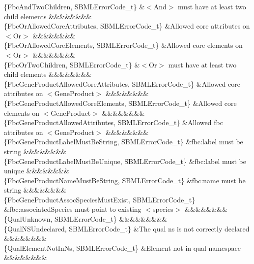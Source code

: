 \begin{DoxyParagraph}{}
\begin{longtabu}
\{Fbc\+And\+Two\+Children, S\+B\+M\+L\+Error\+Code\+\_\+t\} &{\ttfamily $<$And$>$} must have at least two child elements &&&&&&&&\\
\{Fbc\+Or\+Allowed\+Core\+Attributes, S\+B\+M\+L\+Error\+Code\+\_\+t\} &Allowed core attributes on {\ttfamily $<$Or$>$} &&&&&&&&\\
\{Fbc\+Or\+Allowed\+Core\+Elements, S\+B\+M\+L\+Error\+Code\+\_\+t\} &Allowed core elements on {\ttfamily $<$Or$>$} &&&&&&&&\\
\{Fbc\+Or\+Two\+Children, S\+B\+M\+L\+Error\+Code\+\_\+t\} &{\ttfamily $<$Or$>$} must have at least two child elements &&&&&&&&\\
\{Fbc\+Gene\+Product\+Allowed\+Core\+Attributes, S\+B\+M\+L\+Error\+Code\+\_\+t\} &Allowed core attributes on {\ttfamily $<$Gene\+Product$>$} &&&&&&&&\\
\{Fbc\+Gene\+Product\+Allowed\+Core\+Elements, S\+B\+M\+L\+Error\+Code\+\_\+t\} &Allowed core elements on {\ttfamily $<$Gene\+Product$>$} &&&&&&&&\\
\{Fbc\+Gene\+Product\+Allowed\+Attributes, S\+B\+M\+L\+Error\+Code\+\_\+t\} &Allowed fbc attributes on {\ttfamily $<$Gene\+Product$>$} &&&&&&&&\\
\{Fbc\+Gene\+Product\+Label\+Must\+Be\+String, S\+B\+M\+L\+Error\+Code\+\_\+t\} &\textquotesingle{}fbc\+:label\textquotesingle{} must be string &&&&&&&&\\
\{Fbc\+Gene\+Product\+Label\+Must\+Be\+Unique, S\+B\+M\+L\+Error\+Code\+\_\+t\} &\textquotesingle{}fbc\+:label\textquotesingle{} must be unique &&&&&&&&\\
\{Fbc\+Gene\+Product\+Name\+Must\+Be\+String, S\+B\+M\+L\+Error\+Code\+\_\+t\} &\textquotesingle{}fbc\+:name\textquotesingle{} must be string &&&&&&&&\\
\{Fbc\+Gene\+Product\+Assoc\+Species\+Must\+Exist, S\+B\+M\+L\+Error\+Code\+\_\+t\} &\textquotesingle{}fbc\+:associated\+Species\textquotesingle{} must point to existing {\ttfamily $<$species$>$} &&&&&&&&\\
\{Qual\+Unknown, S\+B\+M\+L\+Error\+Code\+\_\+t\} &&&&&&&&&\\
\{Qual\+N\+S\+Undeclared, S\+B\+M\+L\+Error\+Code\+\_\+t\} &The qual ns is not correctly declared &&&&&&&&\\
\{Qual\+Element\+Not\+In\+Ns, S\+B\+M\+L\+Error\+Code\+\_\+t\} &Element not in qual namespace &&&&&&&&\\

\end{longtabu}
\end{DoxyParagraph}
